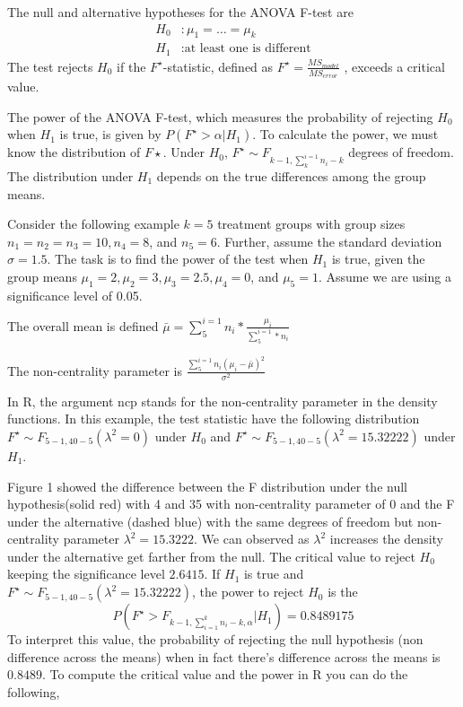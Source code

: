 \documentclass{article}
\begin{document}
The null and alternative hypotheses for the ANOVA F-test are
\[
	\begin{split}
		H_0 & : \mu_1 = \ldots = \mu_k           \\
		H_1 & : \text{at least one is different}
	\end{split}
\]
The test rejects $H_0$ if the $F^\star$-statistic, defined as $F^\star = \frac{MS_{model}}{MS_{error}}$ , exceeds
a critical value.

The power of the ANOVA F-test, which measures the probability of rejecting $H_0$ when $H_1$ is true, is
given by $P(F^\star > \alpha|H_1)$. To calculate the power, we must know the distribution
of $F\star$. Under $H_0$, $F^\star \sim F_{k-1,\sum_{k}^{i=1}n_i-k}$
degrees of freedom. The distribution under $H_1$ depends on
the true differences among the group means.

Consider the following example $k = 5$ treatment groups with group sizes $n_1 = n_2 = n_3 = 10, n_4 = 8$,
and $n_5 = 6$. Further, assume the standard deviation $\sigma = 1.5$. The task is to find the power of the
test when $H_1$ is true, given the group means $\mu_1 = 2, \mu_2 = 3, \mu_3 = 2.5, \mu_4 = 0$, and $\mu_5 = 1$. Assume
we are using a significance level of 0.05.

The overall mean is defined $\bar{\mu}= \sum_{5}^{i=1}n_i*\frac{\mu_i}{\sum_{5}^{i=1}*n_i}$

The non-centrality parameter is $\frac{\sum_{5}^{i=1}n_i(\mu_i-\bar{\mu})^2}{\sigma^2}$

In R, the argument ncp stands for the non-centrality parameter in the density functions. In this example, the test statistic
have the following distribution $F^\star \sim F_{5-1,40-5}(\lambda^2=0)$ under $H_0$ and $F^\star \sim F_{5-1,40-5}(\lambda^2 = 15.32222)$ under $H_1$.

Figure 1 showed the difference between the F distribution under the null hypothesis(solid red) with
4 and 35 with non-centrality parameter of 0 and the F under the alternative (dashed blue) with
the same degrees of freedom but non-centrality parameter $\lambda^2 = 15.3222$. We can observed as $\lambda^2$
increases the density under the alternative get farther from the null. The critical value to reject $H_0$
keeping the significance level $2.6415$. If $H_1$ is true and $F^\star \sim F_{5-1,40-5}(\lambda^2 = 15.32222)$, the power
to reject $H_0$ is the
$$
	P(F^\star>F_{k-1,\sum_{i=1}^{k}n_i-k,\alpha}|H_1)=0.8489175
$$
To interpret this value, the probability of rejecting the null hypothesis (non difference across the
means) when in fact there’s difference across the means is $0.8489$. To compute the critical value
and the power in R you can do the following,
\end{document}
